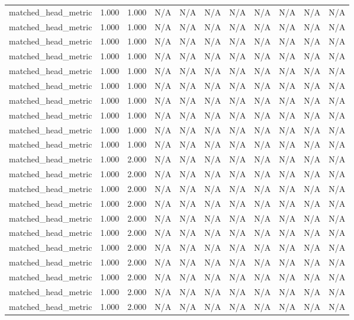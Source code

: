 \begin{table}[h!]
\begin{tabular}{lrrrrrrrrrr}
matched\_head\_metric & 1.000 & 1.000 & N/A & N/A & N/A & N/A & N/A & N/A & N/A & N/A \\
matched\_head\_metric & 1.000 & 1.000 & N/A & N/A & N/A & N/A & N/A & N/A & N/A & N/A \\
matched\_head\_metric & 1.000 & 1.000 & N/A & N/A & N/A & N/A & N/A & N/A & N/A & N/A \\
matched\_head\_metric & 1.000 & 1.000 & N/A & N/A & N/A & N/A & N/A & N/A & N/A & N/A \\
matched\_head\_metric & 1.000 & 1.000 & N/A & N/A & N/A & N/A & N/A & N/A & N/A & N/A \\
matched\_head\_metric & 1.000 & 1.000 & N/A & N/A & N/A & N/A & N/A & N/A & N/A & N/A \\
matched\_head\_metric & 1.000 & 1.000 & N/A & N/A & N/A & N/A & N/A & N/A & N/A & N/A \\
matched\_head\_metric & 1.000 & 1.000 & N/A & N/A & N/A & N/A & N/A & N/A & N/A & N/A \\
matched\_head\_metric & 1.000 & 1.000 & N/A & N/A & N/A & N/A & N/A & N/A & N/A & N/A \\
matched\_head\_metric & 1.000 & 1.000 & N/A & N/A & N/A & N/A & N/A & N/A & N/A & N/A \\
matched\_head\_metric & 1.000 & 2.000 & N/A & N/A & N/A & N/A & N/A & N/A & N/A & N/A \\
matched\_head\_metric & 1.000 & 2.000 & N/A & N/A & N/A & N/A & N/A & N/A & N/A & N/A \\
matched\_head\_metric & 1.000 & 2.000 & N/A & N/A & N/A & N/A & N/A & N/A & N/A & N/A \\
matched\_head\_metric & 1.000 & 2.000 & N/A & N/A & N/A & N/A & N/A & N/A & N/A & N/A \\
matched\_head\_metric & 1.000 & 2.000 & N/A & N/A & N/A & N/A & N/A & N/A & N/A & N/A \\
matched\_head\_metric & 1.000 & 2.000 & N/A & N/A & N/A & N/A & N/A & N/A & N/A & N/A \\
matched\_head\_metric & 1.000 & 2.000 & N/A & N/A & N/A & N/A & N/A & N/A & N/A & N/A \\
matched\_head\_metric & 1.000 & 2.000 & N/A & N/A & N/A & N/A & N/A & N/A & N/A & N/A \\
matched\_head\_metric & 1.000 & 2.000 & N/A & N/A & N/A & N/A & N/A & N/A & N/A & N/A \\
matched\_head\_metric & 1.000 & 2.000 & N/A & N/A & N/A & N/A & N/A & N/A & N/A & N/A \\
matched\_head\_metric & 1.000 & 2.000 & N/A & N/A & N/A & N/A & N/A & N/A & N/A & N/A \\

\end{tabular}
\end{table}
